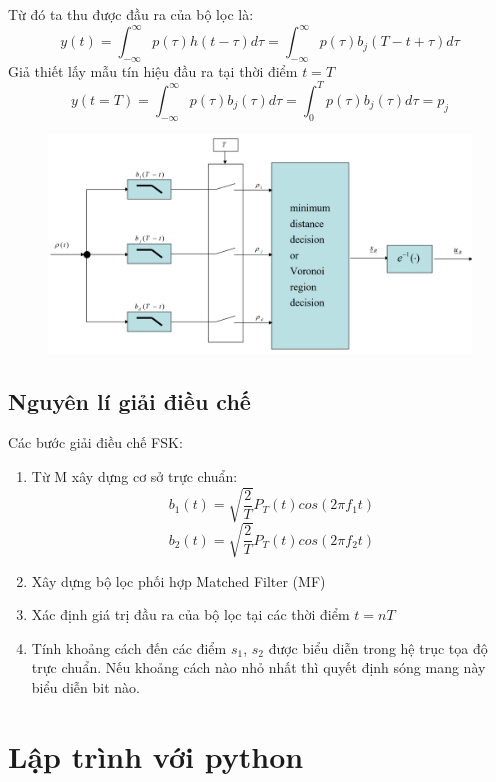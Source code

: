 Từ đó ta thu được đầu ra của bộ lọc là:
\[ y(t) = \displaystyle \int_{-\infty}^{\infty} p(\tau)h(t - \tau) d \tau =   \displaystyle \int_{-\infty}^{\infty} p(\tau)b_j(T - t + \tau) d \tau \]
Giả thiết lấy mẫu tín hiệu đầu ra tại thời điểm $t = T$
\[ y(t=T) = \displaystyle \int_{-\infty}^{\infty} p(\tau)b_j(\tau) d \tau =  \displaystyle \int_{0}^{T} p(\tau)b_j(\tau) d \tau = p_j\]
\begin{center}
    \begin{figure}[htp]
    \begin{center}
     \includegraphics[width=\textwidth]{Img/MF.png}
    \end{center}
    \end{figure}
\end{center}
\subsection{Nguyên lí giải điều chế}
Các bước giải điều chế FSK:
\begin{enumerate}
\item Từ M xây dựng cơ sở trực chuẩn:
\[ b_1(t) = \sqrt{\frac{2}{T}} P_T(t)cos(2 \pi f_1 t) \]
\[ b_2(t) = \sqrt{\frac{2}{T}} P_T(t)cos(2 \pi f_2 t) \]
\item Xây dựng bộ lọc phối hợp Matched Filter (MF)
\item Xác định giá trị đầu ra của bộ lọc tại các thời điểm $t = nT$
\item Tính khoảng cách đến các điểm $s_1$, $s_2$ được biểu diễn trong hệ trục tọa độ trực chuẩn. Nếu khoảng cách nào nhỏ nhất thì quyết định sóng mang này biểu diễn bit nào.



\end{enumerate}


\section{Lập trình với python}
